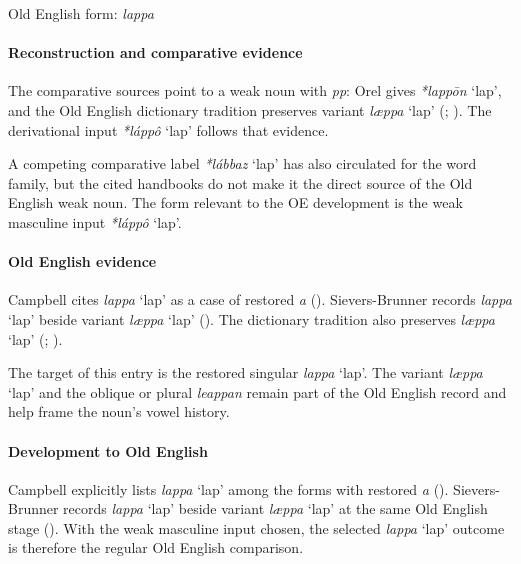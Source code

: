 \documentclass[
  british,
  a4paper,
]{article}
\providecommand{\Recon}[1]{\emph{*#1}}
\begin{document}
Old English form: \emph{lappa}

\paragraph{Reconstruction and comparative
evidence}\label{reconstruction-and-comparative-evidence-101}

The comparative sources point to a weak noun with \emph{pp}: Orel gives
\Recon{lappōn} `lap', and the Old English dictionary tradition preserves
variant \emph{læppa} `lap' (;
). The derivational
input \Recon{láppô} `lap' follows that evidence.

A competing comparative label \Recon{lábbaz} `lap' has also circulated
for the word family, but the cited handbooks do not make it the direct
source of the Old English weak noun. The form relevant to the OE
development is the weak masculine input \Recon{láppô} `lap'.

\paragraph{Old English evidence}\label{old-english-evidence-103}

Campbell cites \emph{lappa} `lap' as a case of restored \emph{a}
(). Sievers-Brunner
records \emph{lappa} `lap' beside variant \emph{læppa} `lap'
(). The
dictionary tradition also preserves \emph{læppa} `lap'
(;
).

The target of this entry is the restored singular \emph{lappa} `lap'.
The variant \emph{læppa} `lap' and the oblique or plural \emph{leappan}
remain part of the Old English record and help frame the noun's vowel
history.

\paragraph{Development to Old
English}\label{development-to-old-english-101}

Campbell explicitly lists \emph{lappa} `lap' among the forms with
restored \emph{a} (). Sievers-Brunner records \emph{lappa} `lap' beside variant
\emph{læppa} `lap' at the same Old English stage
(). With the
weak masculine input chosen, the selected \emph{lappa} `lap' outcome is
therefore the regular Old English comparison.
\end{document}
